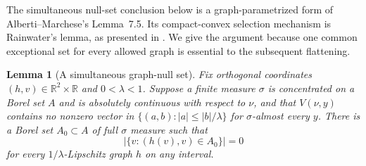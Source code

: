 \documentclass[11pt]{article}
\numberwithin{equation}{section}
\newtheorem{lemma}[theorem]{Lemma}
\theoremstyle{definition}
\theoremstyle{remark}
\begin{document}
The simultaneous null-set conclusion below is a graph-parametrized form of
Alberti--Marchese's Lemma~7.5.  Its compact-convex selection mechanism
is Rainwater's lemma, as presented in
\cite[Lemma~7.1 and Corollary~7.2]{AlbertiMarchese2016}.
We give the argument because one common exceptional set for every
allowed graph is essential to the subsequent flattening.

\begin{lemma}[A simultaneous graph-null set]\label{hp:cone-null}
Fix orthogonal coordinates $(h,v)\in\mathbb R^2\times\mathbb R$ and
$0<\lambda<1$.  Suppose a finite measure $\sigma$ is concentrated on a
Borel set $A$ and is absolutely continuous with respect to $\nu$,
and that $V(\nu,y)$ contains no nonzero vector in
$\{(a,b):|a|\le |b|/\lambda\}$ for $\sigma$-almost every $y$.
There is a Borel set $A_0\subset A$ of full $\sigma$ measure such that
\begin{equation}\label{hp:graph-null}
 \bigl|\{v:(h(v),v)\in A_0\}\bigr|=0
\end{equation}
for every $1/\lambda$-Lipschitz graph $h$ on any interval.
\end{lemma}
\end{document}
